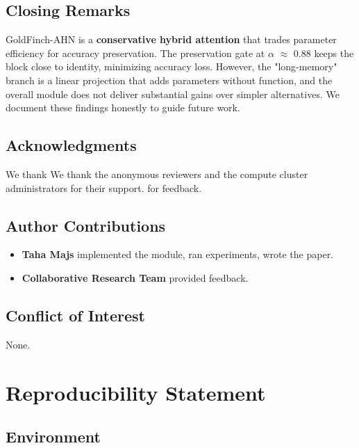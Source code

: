 \subsection{Closing Remarks}

GoldFinch-AHN is a \textbf{conservative hybrid attention} that trades parameter 
efficiency for accuracy preservation. The preservation gate at $\alpha$ $\approx$ 0.88 
keeps the block close to identity, minimizing accuracy loss. However, the 
"long-memory" branch is a linear projection that adds parameters without 
function, and the overall module does not deliver substantial gains over 
simpler alternatives. We document these findings honestly to guide future 
work.

\subsection{Acknowledgments}

We thank We thank the anonymous reviewers and the compute cluster administrators for their support. for feedback.

\subsection{Author Contributions}

\begin{itemize}
\item \textbf{Taha Majs} implemented the module, ran experiments, wrote the paper.
\item \textbf{Collaborative Research Team} provided feedback.

\end{itemize}
\subsection{Conflict of Interest}

None.




\section{Reproducibility Statement}

\subsection{Environment}

